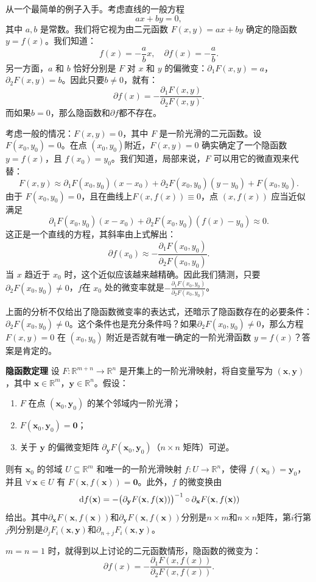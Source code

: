 \documentclass[12pt,UTF8]{ctexbook}
\begin{document}
从一个最简单的例子入手。考虑直线的一般方程
\[
ax+by=0,
\]
其中 $a,b$ 是常数。我们将它视为由二元函数 $F(x,y)=ax+by$ 确定的隐函数 $y=f(x)$。我们知道：
\[
f(x)=-\frac{a}{b}x,\quad \partial f(x) = -\frac{a}{b}.
\]
另一方面，$a$ 和 $b$ 恰好分别是 $F$ 对 $x$ 和 $y$ 的偏微变：$\partial_1F(x,y)=a$，$\partial_2F(x,y)=b$。因此只要$b\neq 0$，就有：
\[
\partial f(x)=-\frac{\partial_1F(x,y)}{\partial_2F(x,y)}.
\]
而如果$b = 0$，那么隐函数和$\partial f$都不存在。

考虑一般的情况：$F(x,y)=0$，其中 $F$ 是一阶光滑的二元函数。设$F(x_0,y_0)=0$。在点 $(x_0,y_0)$附近，$F(x,y)=0$ 确实确定了一个隐函数 $y=f(x)$，且 $f(x_0)=y_0$。我们知道，局部来说，$F$ 可以用它的微直观来代替：
\[
F(x,y)\approx \partial_1F(x_0,y_0)(x-x_0)+\partial_2F(x_0,y_0)(y-y_0)+F(x_0,y_0).
\]
由于 $F(x_0,y_0)=0$，且在曲线上$F(x,f(x))\equiv0$，点 $(x,f(x))$ 应当近似满足
\[
\partial_1F(x_0,y_0)(x-x_0)+\partial_2F(x_0,y_0)(f(x)-y_0)\approx0.
\]
这正是一个直线的方程，其斜率由上式解出：
\[
\partial f(x_0)\approx -\frac{\partial_1F(x_0,y_0)}{\partial_2F(x_0,y_0)}.
\]
当 $x$ 趋近于 $x_0$ 时，这个近似应该越来越精确。因此我们猜测，只要 $\partial_2F(x_0,y_0)\neq0$，$f$在 $x_0$ 处的微变率就是$\displaystyle -\frac{\partial_1F(x_0,y_0)}{\partial_2F(x_0,y_0)}$。

上面的分析不仅给出了隐函数微变率的表达式，还暗示了隐函数存在的必要条件：$\partial_2F(x_0,y_0)\neq0$。这个条件也是充分条件吗？如果$\partial_2F(x_0,y_0)\neq0$，那么方程 $F(x,y)=0$ 在 $(x_0,y_0)$ 附近是否就有唯一确定的一阶光滑函数 $y=f(x)$？答案是肯定的。
\begin{tm}{\textbf{隐函数定理}}\label{tm:2-2-10}
设 $F:\mathbb{R}^{m+n}\to\mathbb{R}^n$ 是开集上的一阶光滑映射，将自变量写为 $(\mathbf{x},\mathbf{y})$，其中 $\mathbf{x}\in\mathbb{R}^m$，$\mathbf{y}\in\mathbb{R}^n$。假设：
\begin{enumerate}[label=\arabic*.]
    \item $F$ 在点 $(\mathbf{x}_0,\mathbf{y}_0)$ 的某个邻域内一阶光滑；
    \item $F(\mathbf{x}_0,\mathbf{y}_0)=\mathbf{0}$；
    \item 关于 $\mathbf{y}$ 的偏微变矩阵 $\partial_{\mathbf{y}}F(\mathbf{x}_0,\mathbf{y}_0)$（$n\times n$ 矩阵）可逆。
\end{enumerate}
则有 $\mathbf{x}_0$ 的邻域 $U\subseteq\mathbb{R}^m$ 和唯一的一阶光滑映射 $f:U\to\mathbb{R}^n$，使得 $f(\mathbf{x}_0)=\mathbf{y}_0$，并且 $\forall\,\mathbf{x}\in U$ 有 $F(\mathbf{x},f(\mathbf{x}))=\mathbf{0}$。此外，$f$ 的微变换由
\[
\,\mathrm{d} f(\mathbf{x}) = -\bigl(\partial_{\mathbf{y}}F(\mathbf{x},f(\mathbf{x}))\bigr)^{-1}\circ\partial_{\mathbf{x}}F(\mathbf{x},f(\mathbf{x}))
\]
给出。其中$\partial_{\mathbf{x}}F(\mathbf{x},f(\mathbf{x}))$和$\partial_{\mathbf{y}}F(\mathbf{x},f(\mathbf{x}))$分别是$n\times m$和$n\times n$矩阵，第$i$行第$j$列分别是$\partial_j F_{i}(\mathbf{x},\mathbf{y})$和$\partial_{n+j} F_i(\mathbf{x},\mathbf{y})$。
\end{tm}
$m=n=1$ 时，就得到以上讨论的二元函数情形，隐函数的微变为：
\[
\partial f(x)=-\frac{\partial_1F(x,f(x))}{\partial_2F(x,f(x))}.
\]
\end{document}
